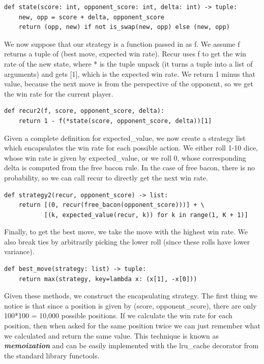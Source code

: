 \documentclass[11pt, oneside]{article}
\newcommand{\emphasis}[1]{\textbf{\textit{#1}}}
\begin{document}
\begin{verbatim}
def state(score: int, opponent_score: int, delta: int) -> tuple:
    new, opp = score + delta, opponent_score
    return (opp, new) if not is_swap(new, opp) else (new, opp)
\end{verbatim}

We now suppose that our strategy is a function passed in as f.
We assume f returns a tuple of (best move, expected win rate).
Recur uses f to get the win rate of the new state,
where * is the tuple unpack (it turns a tuple into a list of arguments)
and gets [1], which is the expected win rate.
We return 1 minus that value, because the next move is from the perspective
of the opponent, so we get the win rate for the current player.

\begin{verbatim}
def recur2(f, score, opponent_score, delta):
    return 1 - f(*state(score, opponent_score, delta))[1]
\end{verbatim} 

Given a complete definition for expected\_value,
we now create a strategy list 
which encapsulates the win rate for each possible action.
We either roll 1-10 dice, whose win rate is given by expected\_value,
or we roll 0, whose corresponding delta is computed from the free bacon rule.
In the case of free bacon, there is no probability, 
so we can call recur to directly get the next win rate. 

\begin{verbatim}
def strategy2(recur, opponent_score) -> list:
    return [(0, recur(free_bacon(opponent_score)))] + \
           [(k, expected_value(recur, k)) for k in range(1, K + 1)]
\end{verbatim} 

Finally, to get the best move, we take the move with the highest win rate.
We also break ties by arbitrarily picking the lower roll
(since these rolls have lower variance). 
\begin{verbatim}
def best_move(strategy: list) -> tuple:
    return max(strategy, key=lambda x: (x[1], -x[0])) 
\end{verbatim} 

Given these methods, we construct the encapsulating strategy.
The first thing we notice is that since a position is given by (score, opponent\_score),
there are only 100*100 = 10,000 possible positions.
If we calculate the win rate for each position, then when asked for the 
same position twice we can just remember what we calculated and
return the same value. This technique is known as \emphasis{memoization}
and can be easily implemented with the lru\_cache decorator 
from the standard library functools.
\end{document}
